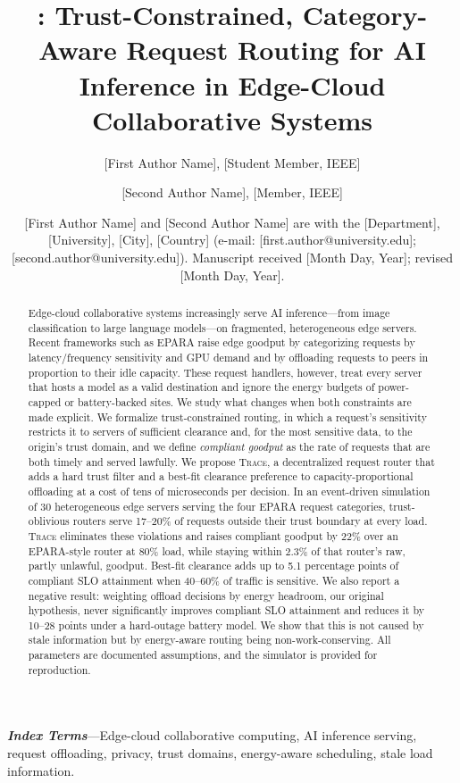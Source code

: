 \documentclass{article}
\title{\sys: Trust-Constrained, Category-Aware Request Routing for AI Inference in Edge-Cloud Collaborative Systems}
\author{[First Author Name], [Student Member, IEEE] \and [Second Author Name], [Member, IEEE]}
\date{[First Author Name] and [Second Author Name] are with the [Department], [University], [City], [Country] (e-mail: [first.author@university.edu]; [second.author@university.edu]). Manuscript received [Month Day, Year]; revised [Month Day, Year].}
\newcommand{\sys}{\textsc{Trace}}
\begin{document}
\maketitle


\begin{abstract}
Edge-cloud collaborative systems increasingly serve AI inference---from image classification to large language models---on fragmented, heterogeneous edge servers. Recent frameworks such as EPARA raise edge goodput by categorizing requests by latency/frequency sensitivity and GPU demand and by offloading requests to peers in proportion to their idle capacity. These request handlers, however, treat every server that hosts a model as a valid destination and ignore the energy budgets of power-capped or battery-backed sites. We study what changes when both constraints are made explicit. We formalize trust-constrained routing, in which a request's sensitivity restricts it to servers of sufficient clearance and, for the most sensitive data, to the origin's trust domain, and we define \emph{compliant goodput} as the rate of requests that are both timely and served lawfully. We propose \sys{}, a decentralized request router that adds a hard trust filter and a best-fit clearance preference to capacity-proportional offloading at a cost of tens of microseconds per decision. In an event-driven simulation of 30 heterogeneous edge servers serving the four EPARA request categories, trust-oblivious routers serve 17--20\% of requests outside their trust boundary at every load. \sys{} eliminates these violations and raises compliant goodput by 22\% over an EPARA-style router at 80\% load, while staying within 2.3\% of that router's raw, partly unlawful, goodput. Best-fit clearance adds up to 5.1 percentage points of compliant SLO attainment when 40--60\% of traffic is sensitive. We also report a negative result: weighting offload decisions by energy headroom, our original hypothesis, never significantly improves compliant SLO attainment and reduces it by 10--28 points under a hard-outage battery model. We show that this is not caused by stale information but by energy-aware routing being non-work-conserving. All parameters are documented assumptions, and the simulator is provided for reproduction.
\end{abstract}

\noindent\textbf{\textit{Index Terms}}---Edge-cloud collaborative computing, AI inference serving, request offloading, privacy, trust domains, energy-aware scheduling, stale load information.
\end{document}
